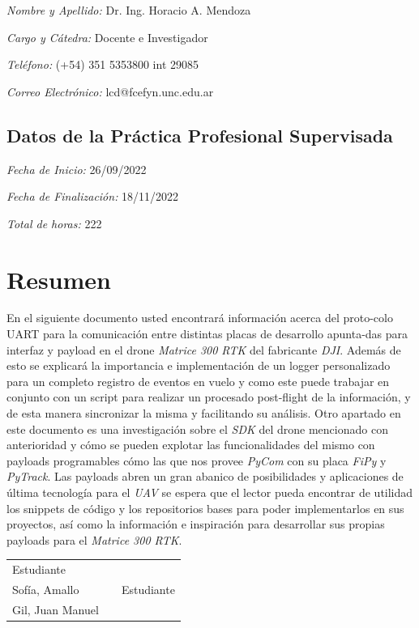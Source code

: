 \documentclass[12pt]{article}
\begin{document}
\textsl{Nombre y Apellido:} Dr. Ing. Horacio A. Mendoza

\textsl{Cargo y Cátedra:} Docente e Investigador

\textsl{Teléfono:} (+54) 351 5353800 int 29085

\textsl{Correo Electrónico:} lcd@fcefyn.unc.edu.ar

\subsection{Datos de la Práctica Profesional Supervisada}

\textsl{Fecha de Inicio:} 26/09/2022

\textsl{Fecha de Finalización:} 18/11/2022

\textsl{Total de horas:} 222

\tableofcontents
\newpage

\justifying
\section{Resumen}
En el siguiente documento usted encontrará información acerca del proto-colo UART para la comunicación entre distintas placas de desarrollo apunta-das para interfaz y payload en el drone \textit{Matrice 300 RTK} del fabricante \textit{DJI}. Además de esto se explicará la importancia e implementación de un logger personalizado para un completo registro de eventos en vuelo y como este puede trabajar en conjunto con un script para realizar un procesado post-flight de la información, y de esta manera sincronizar la misma y facilitando su análisis.
Otro apartado en este documento es una investigación sobre el \textit{SDK} del drone mencionado con anterioridad y cómo se pueden explotar las funcionalidades del mismo con payloads programables cómo las que nos provee \textit{PyCom} con su placa \textit{FiPy} y \textit{PyTrack}.
Las payloads abren un gran abanico de posibilidades y aplicaciones de última tecnología para el \textit{UAV} se espera que el lector pueda encontrar de utilidad los snippets de código y los repositorios bases para poder implementarlos en sus proyectos, así como la información e inspiración para desarrollar sus propias payloads para el \textit{Matrice 300 RTK}.

\vspace{1.5cm}
\begin{tabular}{p{5.5cm}cp{5.5cm}}
  \cline{1-1} \cline{3-3} \\
  \centering Estudiante   \\ Sofía, Amallo && \centering Estudiante \\ Gil, Juan Manuel
\end{tabular}
\end{document}

